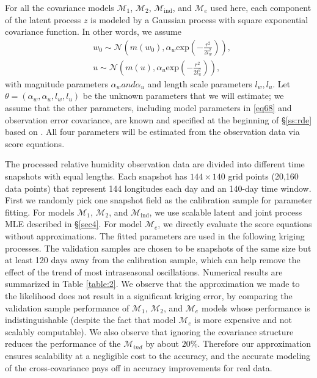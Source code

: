 \documentclass[article,ij4uq]{ij4uq}              %
\newcommand{\cm}[1]{{\color{red}Mihai:{#1}}}
\newcommand{\YC}[1]{\textcolor{blue}{[Yian:#1]}}
\begin{document}
\par For all the covariance models $\mathcal{M}_{1}$, $\mathcal{M}_{2}$, $\mathcal{M}_{\mathrm{ind}}$, and $\mathcal{M}_{e}$ used here, each component of the latent process $z$ is modeled by a Gaussian process with square exponential covariance function. In other words, we assume
\begin{align}
    &w_{0}\sim\mathcal{N}(m(w_{0}),\alpha_{w}\mathrm{exp}(-\frac{r^{2}}{2l_{w}^{2}})),\label{eqn1}\\ &u\sim\mathcal{N}(m(u),\alpha_{u}\mathrm{exp}(-\frac{r^{2}}{2l_{u}^{2}})),\label{eqn2}
\end{align}
with magnitude parameters $\alpha_{w} and\alpha_{u}$ and length scale parameters $l_{w},l_{u}$. Let $\theta=(\alpha_{w},\alpha_{u},l_{w},l_{u})$  be the unknown parameters that we will estimate; we assume that the other parameters, including model parameters in \eqref{eq68} and observation error covariance, are known and specified at the beginning of \S \ref{ss:rde} based on \cite{stechmann2017unified}. All four parameters will be estimated from the observation data via score equations.

\par The processed relative humidity observation data are divided into different time snapshots with equal lengths. Each snapshot has $144\times 140$ grid points (20,160 data points) that represent 144 longitudes each day and an 140-day time window. First we randomly pick one snapshot field as the calibration sample for parameter fitting. For models $\mathcal{M}_{1}$, $\mathcal{M}_{2}$, and $\mathcal{M}_{\mathrm{ind}}$, we use scalable latent and joint process MLE described in \S \ref{sec4}. For model $\mathcal{M}_{e}$, we directly evaluate the score equations without approximations. The fitted parameters are used in the following kriging processes. The validation samples are chosen to be snapshots of the same size but at least 120 days away from the calibration sample, which can help remove the effect of the trend of most intraseasonal oscillations. Numerical results are summarized in Table \ref{table:2}. We observe that  the approximation we made to the likelihood does not result in a significant kriging error, by comparing the  validation sample performance of $\mathcal{M}_{1}$, $\mathcal{M}_{2}$, and $\mathcal{M}_{e}$ models whose performance is indistinguishable (despite the fact that model $\mathcal{M}_{e}$ is more expensive and not scalably computable). We also observe that ignoring the covariance structure reduces the performance of the $\mathcal{M}_{ind}$ by about $20\%$. Therefore our approximation ensures scalability at a negligible cost to the accuracy, and the accurate modeling of the cross-covariance pays off in accuracy improvements for real data. 
 
\end{document}
